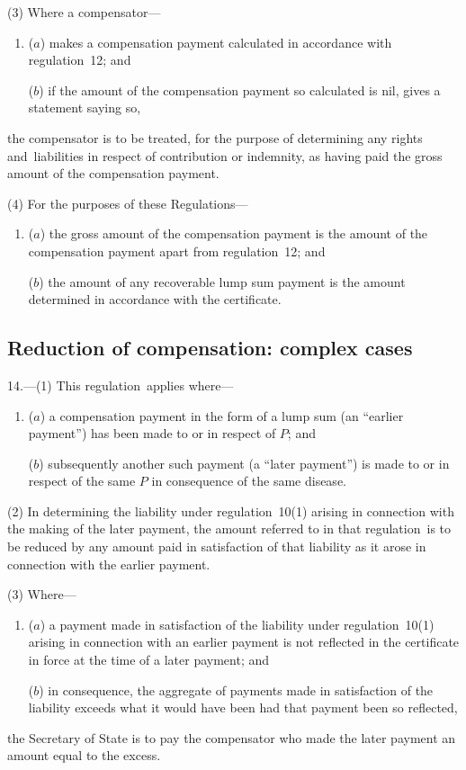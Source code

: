 \documentclass[12pt,a4paper]{article}
\begin{document}
(3) Where a compensator—
\begin{enumerate}\item[]
($a$) makes a compensation payment calculated in accordance with regulation~12; and

($b$) if the amount of the compensation payment so calculated is nil, gives a statement saying so,
\end{enumerate}
the compensator is to be treated, for the purpose of determining any rights and~liabilities in respect of contribution or indemnity, as having paid the gross amount of the compensation payment.

(4) For the purposes of these Regulations—
\begin{enumerate}\item[]
($a$) the gross amount of the compensation payment is the amount of the compensation payment apart from regulation~12; and

($b$) the amount of any recoverable lump sum payment is the amount determined in accordance with the certificate.
\end{enumerate}

\subsection[14. Reduction of compensation: complex cases]{Reduction of compensation: complex cases}

14.---(1)  This regulation~applies where—
\begin{enumerate}\item[]
($a$) a compensation payment in the form of a lump sum (an “earlier payment”) has been made to or in respect of $P$; and

($b$) subsequently another such payment (a “later payment”) is made to or in respect of the same $P$ in consequence of the same disease.
\end{enumerate}

(2) In determining the liability under regulation~10(1) arising in connection with the making of the later payment, the amount referred to in that regulation~is to be reduced by any amount paid in satisfaction of that liability as it arose in connection with the earlier payment.

(3) Where—
\begin{enumerate}\item[]
($a$) a payment made in satisfaction of the liability under regulation~10(1) arising in connection with an earlier payment is not reflected in the certificate in force at the time of a later payment; and

($b$) in consequence, the aggregate of payments made in satisfaction of the liability exceeds what it would have been had that payment been so reflected,
\end{enumerate}
the Secretary of State is to pay the compensator who made the later payment an amount equal to the excess.
\end{document}
